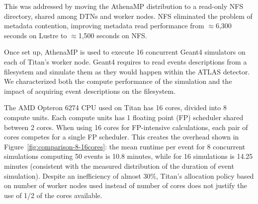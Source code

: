 %
%
%
This was addressed by moving the AthenaMP distribution to a read-only NFS
directory, shared among DTNs and worker nodes. NFS eliminated the problem of
metadata contention, improving metadata read performance from $\approx$6,300
seconds on Lustre to $\approx$1,500 seconds on NFS.



Once set up, AthenaMP is used to execute 16 concurrent Geant4 simulators on each
of Titan's worker node. Geant4 requires to read events descriptions from a
filesystem and simulate them as they would happen within the ATLAS detector. We
characterized both the compute performance of the simulation and the impact of
acquiring event descriptions on the filesystem.

The AMD Opteron 6274 CPU used on Titan has 16 cores, divided into 8 compute
units. Each compute units has 1 floating point (FP) scheduler shared between 2
cores. When using 16 cores for FP-intensive calculations, each pair of cores
competes for a single FP scheduler. This creates the overhead shown in
Figure~\ref{fig:comparison-8-16cores}: the mean runtime per event for 8
concurrent simulations computing 50 events is 10.8 minutes, while for 16
simulations is 14.25 minutes (consistent with the measured distribution of the
duration of event simulation). Despite an inefficiency of almost 30\%, Titan's
allocation policy based on number of worker nodes used instead of number of
cores does not justify the use of 1/2 of the cores available.

